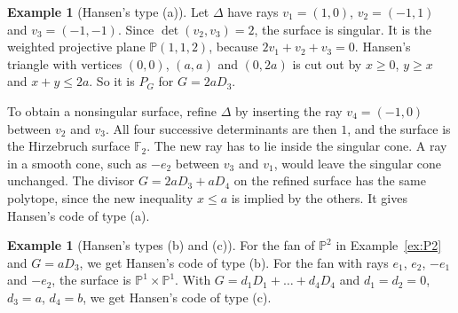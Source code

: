 \documentclass[12pt,letterpaper]{article}
\numberwithin{equation}{section}
\theoremstyle{definition}
\newtheorem{example}[theorem]{Example}
\theoremstyle{remark}
\newcommand{\F}{\mathbb{F}}
\newcommand{\PP}{\mathbb{P}}
\begin{document}
\begin{example}[Hansen's type (a)]\label{example:fan5}
Let $\Delta$ have rays $v_1=(1,0)$, $v_2=(-1,1)$ and $v_3=(-1,-1)$. Since
$\det(v_2,v_3)=2$, the surface is singular. It is the weighted projective
plane $\PP(1,1,2)$, because $2v_1+v_2+v_3=0$. Hansen's triangle with vertices
$(0,0)$, $(a,a)$ and $(0,2a)$ is cut out by $x\ge0$, $y\ge x$ and $x+y\le2a$.
So it is $P_G$ for $G=2aD_3$.

To obtain a nonsingular surface, refine $\Delta$ by inserting the ray
$v_4=(-1,0)$ between $v_2$ and $v_3$. All four successive determinants are then
$1$, and the surface is the Hirzebruch surface $\F_2$. The new ray has to lie
inside the singular cone. A ray in a smooth cone, such as $-e_2$ between $v_3$
and $v_1$, would leave the singular cone unchanged. The divisor $G=2aD_3+aD_4$ on the refined
surface has the same polytope, since the new inequality $x\le a$ is implied by
the others. It gives Hansen's code of type (a).
\end{example}

\begin{example}[Hansen's types (b) and (c)]\label{example:fan4}
For the fan of $\PP^2$ in Example~\ref{ex:P2} and $G=aD_3$, we get Hansen's
code of type (b). For the fan with rays $e_1$, $e_2$, $-e_1$ and $-e_2$, the
surface is $\PP^1\times\PP^1$. With $G=d_1D_1+\dots+d_4D_4$ and $d_1=d_2=0$,
$d_3=a$, $d_4=b$, we get Hansen's code of type (c).
\end{example}
\end{document}
